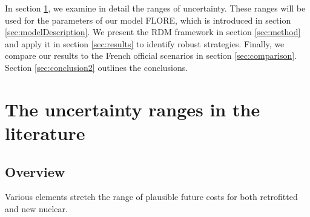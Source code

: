 In section \ref{sec:plausibleValues}, we examine in detail the ranges of uncertainty. These ranges will be used for the parameters of our model FLORE, which is introduced in section \ref{sec:modelDescription}. We present the RDM framework in section \ref{sec:method} and apply it in section \ref{sec:results} to identify robust strategies. Finally, we compare our results to the French official scenarios in section \ref{sec:comparison}. Section \ref{sec:conclusion2} outlines the conclusions.




\section{The uncertainty ranges in the literature}
\label{sec:plausibleValues}

\subsection{Overview}
Various elements stretch the range of plausible future costs for both retrofitted and new nuclear.

